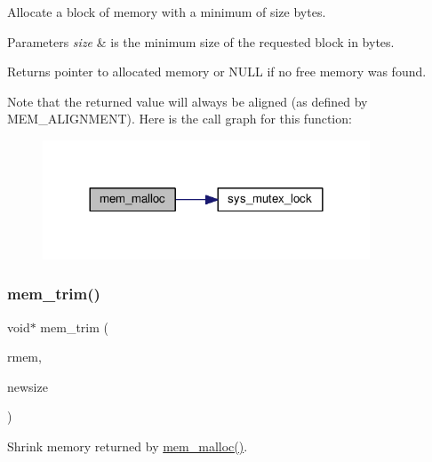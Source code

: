 Allocate a block of memory with a minimum of \textquotesingle{}size\textquotesingle{} bytes.


\begin{DoxyParams}{Parameters}
{\em size} & is the minimum size of the requested block in bytes. \\
\hline
\end{DoxyParams}
\begin{DoxyReturn}{Returns}
pointer to allocated memory or N\+U\+LL if no free memory was found.
\end{DoxyReturn}
Note that the returned value will always be aligned (as defined by M\+E\+M\+\_\+\+A\+L\+I\+G\+N\+M\+E\+NT). Here is the call graph for this function\+:
\nopagebreak
\begin{figure}[H]
\begin{center}
\leavevmode
\includegraphics[width=276pt]{openmote-cc2538_2lwip_2src_2core_2mem_8c_a932aa40d85b14cb7331625e012d12335_cgraph}
\end{center}
\end{figure}
\mbox{\label{openmote-cc2538_2lwip_2src_2core_2mem_8c_a2f0214c1c0d4acf856fb3ec76818a5a9}} 
\subsubsection{\texorpdfstring{mem\+\_\+trim()}{mem\_trim()}}
{\footnotesize\ttfamily void$\ast$ mem\+\_\+trim (\begin{DoxyParamCaption}\item[{void $\ast$}]{rmem,  }\item[{\hyperlink{native_2lwip_2src_2include_2lwip_2mem_8h_a49bff6e5dd4cb95fe6dc0670962bbf54}{mem\+\_\+size\+\_\+t}}]{newsize }\end{DoxyParamCaption})}

Shrink memory returned by \hyperlink{native_2lwip_2src_2core_2mem_8c_a932aa40d85b14cb7331625e012d12335}{mem\+\_\+malloc()}.



